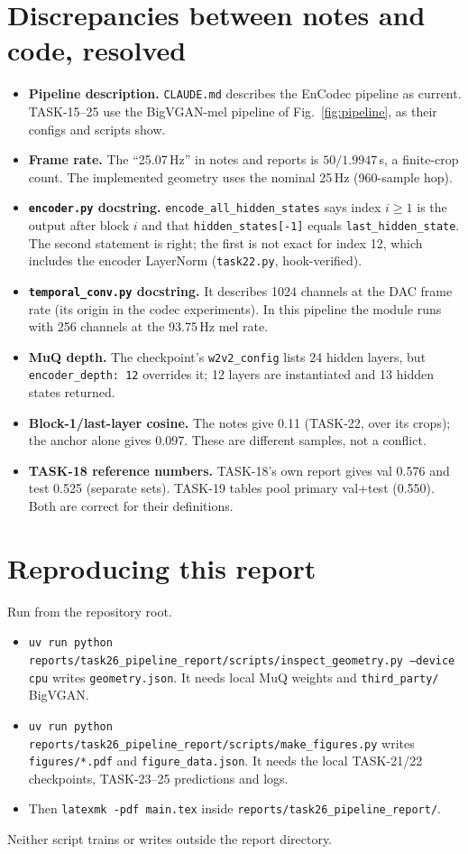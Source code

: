\documentclass[10pt,letterpaper]{article}
\newcommand{\src}[1]{\nolinkurl{#1}}
\begin{document}
\section{Discrepancies between notes and code, resolved}
\label{app:discrepancies}
\begin{itemize}
\item \textbf{Pipeline description.} \src{CLAUDE.md} describes the EnCodec pipeline as current. TASK-15--25 use the BigVGAN-mel pipeline of Fig.~\ref{fig:pipeline}, as their configs and scripts show.
\item \textbf{Frame rate.} The ``25.07\,Hz'' in notes and reports is $50/1.9947$\,s, a finite-crop count. The implemented geometry uses the nominal 25\,Hz (960-sample hop).
\item \textbf{\texttt{encoder.py} docstring.} \texttt{encode\_all\_hidden\_states} says index $i\ge1$ is the output after block $i$ and that \texttt{hidden\_states[-1]} equals \texttt{last\_hidden\_state}. The second statement is right; the first is not exact for index 12, which includes the encoder LayerNorm (\src{task22.py}, hook-verified).
\item \textbf{\texttt{temporal\_conv.py} docstring.} It describes 1024 channels at the DAC frame rate (its origin in the codec experiments). In this pipeline the module runs with 256 channels at the 93.75\,Hz mel rate.
\item \textbf{MuQ depth.} The checkpoint's \texttt{w2v2\_config} lists 24 hidden layers, but \texttt{encoder\_depth: 12} overrides it; 12 layers are instantiated and 13 hidden states returned.
\item \textbf{Block-1/last-layer cosine.} The notes give 0.11 (TASK-22, over its crops); the anchor alone gives 0.097. These are different samples, not a conflict.
\item \textbf{TASK-18 reference numbers.} TASK-18's own report gives val 0.576 and test 0.525 (separate sets). TASK-19 tables pool primary val+test (0.550). Both are correct for their definitions.
\end{itemize}

\section{Reproducing this report}
Run from the repository root.
\begin{itemize}
\item \texttt{uv run python reports/task26\_pipeline\_report/scripts/inspect\_geometry.py --device cpu} writes \src{geometry.json}. It needs local MuQ weights and \src{third_party/} BigVGAN.
\item \texttt{uv run python reports/task26\_pipeline\_report/scripts/make\_figures.py} writes \src{figures/*.pdf} and \src{figure_data.json}. It needs the local TASK-21/22 checkpoints, TASK-23--25 predictions and logs.
\item Then \texttt{latexmk -pdf main.tex} inside \src{reports/task26_pipeline_report/}.
\end{itemize}
Neither script trains or writes outside the report directory.
\end{document}
